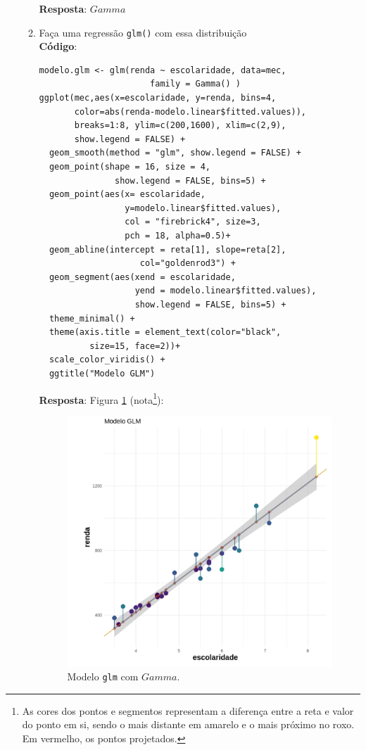 \documentclass[a4paper,12pt]{article}
\begin{document}
\begin{enumerate}
\begin{enumerate}
        \textbf{Resposta}: $Gamma$
        \item[1.12] Faça uma regressão \texttt{glm()} com essa distribuição \\
        \textbf{Código}:
            \begin{lstlisting}
modelo.glm <- glm(renda ~ escolaridade, data=mec, 
                      family = Gamma() )
ggplot(mec,aes(x=escolaridade, y=renda, bins=4,
       color=abs(renda-modelo.linear$fitted.values)), 
       breaks=1:8, ylim=c(200,1600), xlim=c(2,9), 
       show.legend = FALSE) +
  geom_smooth(method = "glm", show.legend = FALSE) + 
  geom_point(shape = 16, size = 4, 
               show.legend = FALSE, bins=5) +  
  geom_point(aes(x= escolaridade, 
                 y=modelo.linear$fitted.values), 
                 col = "firebrick4", size=3, 
                 pch = 18, alpha=0.5)+
  geom_abline(intercept = reta[1], slope=reta[2], 
                    col="goldenrod3") +
  geom_segment(aes(xend = escolaridade, 
                   yend = modelo.linear$fitted.values),
                   show.legend = FALSE, bins=5) + 
  theme_minimal() +
  theme(axis.title = element_text(color="black", 
          size=15, face=2))+
  scale_color_viridis() +
  ggtitle("Modelo GLM")
            \end{lstlisting}
            \textbf{Resposta}: Figura \ref{fig2glm} (nota\footnote{As cores dos pontos e segmentos representam a diferença entre a reta e valor do ponto em si, sendo o mais distante em amarelo e o mais próximo no roxo. Em vermelho, os pontos projetados.}):
                \begin{figure}[h!tb]
                     \centering
                     \includegraphics[scale=0.45]{2_1f_glm.png}
                     \caption{Modelo \texttt{glm} com $Gamma$.}
                     \label{fig2glm}
                \end{figure}


\end{enumerate}
\end{enumerate}
\end{document}
